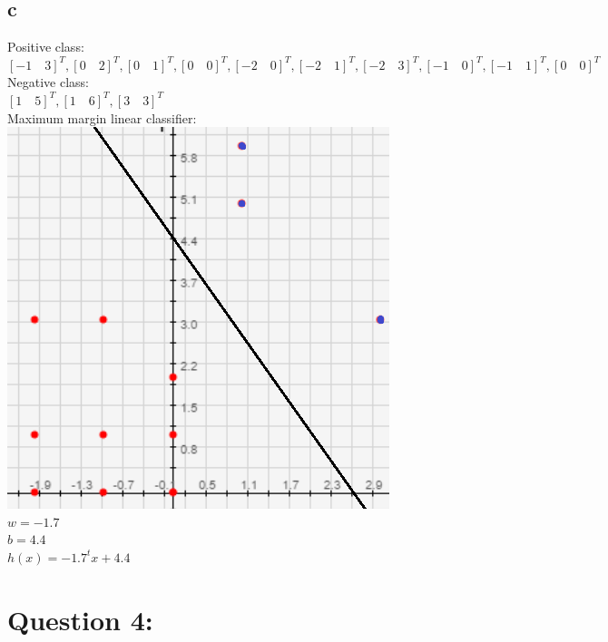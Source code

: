 \documentclass[11pt, oneside]{article}   	%
\begin{document}
\begin{flushleft}
\subsection*{c}
Positive class: \\
$[-1\quad3]^T ,[0\quad2]^T ,[0\quad1]^T ,[0\quad0]^T ,[-2\quad0]^T ,[-2\quad1]^T ,[-2\quad3]^T ,[-1\quad0]^T ,[-1\quad1]^T ,[0\quad0]^T$\\
Negative class: \\
$[1\quad5]^T ,[1\quad6]^T ,[3\quad3]^T $\\
Maximum margin linear classifier:\\
\includegraphics[]{q3_2.png} \\
$w=-1.7$\\
$b=4.4$\\
 $h(x)=-1.7^t x+4.4$\\
\section*{Question 4:}

\end{flushleft}
\end{document}
